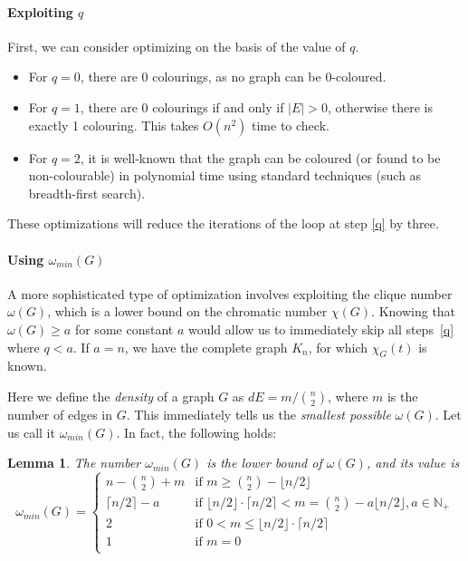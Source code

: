 \documentclass[a4paper]{article}
\newtheorem{lemma}{Lemma}
\begin{document}
\paragraph{Exploiting $q$}
First, we can consider optimizing on the basis of the value of $q$.
\begin{itemize}
\item For $q = 0$, there are 0 colourings, as no graph can be 0-coloured.
\item For $q = 1$, there are 0 colourings if and only if $|E| > 0$, otherwise there is exactly 1 colouring. This takes $O(n^2)$ time to check.
\item For $q = 2$, it is well-known that the graph can be coloured (or found to be non-colourable) in polynomial time using standard techniques (such as breadth-first search).
\end{itemize}

These optimizations will reduce the iterations of the loop at step \ref{q} by three.

\paragraph{Using $\omega_{min}(G)$}
A more sophisticated type of optimization involves exploiting the clique number $\omega(G)$, which is a lower bound on the chromatic number $\chi(G)$. Knowing that $\omega(G) \geq a$ for some constant $a$ would allow us to immediately skip all steps~\ref{q} where $q < a$. If $a = n$, we have the complete graph $K_n$, for which $\chi_G(t)$ is known.

Here we define the \emph{density} of a graph $G$ as $dE = m/\binom{n}{2}$, where $m$ is the number of edges in $G$. This immediately tells us the \emph{smallest possible} $\omega(G)$. Let us call it $\omega_{min}(G)$. In fact, the following holds:

\begin{lemma}\label{lemma1}
The number $\omega_{min}(G)$ is the lower bound of $\omega(G)$, and its value is
\[
\omega_{min}(G) = 
\begin{cases}
	  n - \binom{n}{2} + m & \text{if } m \geq \binom{n}{2} - \lfloor n/2 \rfloor \\
	  \lceil n / 2 \rceil - a & \text{if }  \lfloor n / 2 \rfloor \cdot \lceil n / 2 \rceil < m = \binom{n}{2} - a \lfloor n/2 \rfloor, a \in \mathbb{N}_+ \\
	  2 & \text{if } 0 < m \leq \lfloor n / 2 \rfloor \cdot \lceil n / 2 \rceil \\
	  1 & \text{if } m = 0 \\
\end{cases}
\]
\end{lemma}
\end{document}
